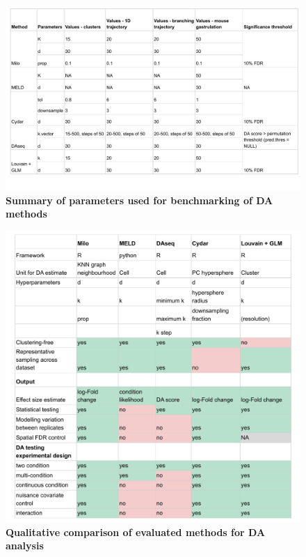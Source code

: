 \documentclass[
]{article}
\begin{document}
\begin{figure}
\centering
\includegraphics{suppl_tables/table_methods_params.pdf}
\caption{\label{fig:sup-tab-3}\textbf{Summary of parameters used for benchmarking of DA methods}}
\end{figure}



\begin{figure}
\centering
\includegraphics{suppl_tables/table_methods_comparison.pdf}
\caption{\label{fig:sup-tab-1}\textbf{Qualitative comparison of evaluated methods for DA analysis}}
\end{figure}



\newpage
\end{document}
